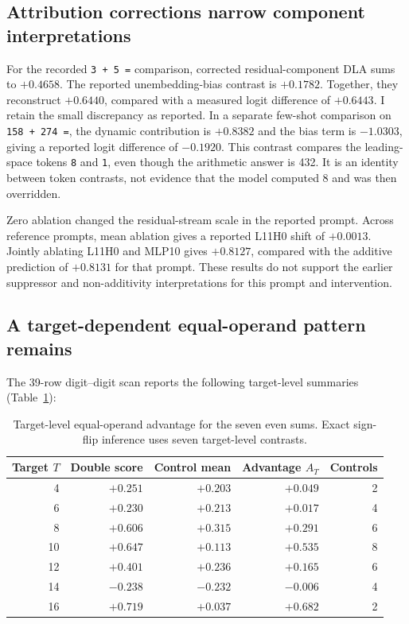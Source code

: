 \documentclass[11pt]{article}
\begin{document}
\subsection{Attribution corrections narrow component interpretations}

For the recorded \texttt{3 + 5 =} comparison, corrected residual-component DLA sums to $+0.4658$. The reported unembedding-bias contrast is $+0.1782$. Together, they reconstruct $+0.6440$, compared with a measured logit difference of $+0.6443$. I retain the small discrepancy as reported. In a separate few-shot comparison on \texttt{158 + 274 =}, the dynamic contribution is $+0.8382$ and the bias term is $-1.0303$, giving a reported logit difference of $-0.1920$. This contrast compares the leading-space tokens \texttt{8} and \texttt{1}, even though the arithmetic answer is 432. It is an identity between token contrasts, not evidence that the model computed 8 and was then overridden.

Zero ablation changed the residual-stream scale in the reported prompt. Across reference prompts, mean ablation gives a reported L11H0 shift of $+0.0013$. Jointly ablating L11H0 and MLP10 gives $+0.8127$, compared with the additive prediction of $+0.8131$ for that prompt. These results do not support the earlier suppressor and non-additivity interpretations for this prompt and intervention.

\subsection{A target-dependent equal-operand pattern remains}

The 39-row digit--digit scan reports the following target-level summaries (Table~\ref{tab:doubles-targets}):

\begin{table}[t]
\centering
\caption{Target-level equal-operand advantage for the seven even sums. Exact sign-flip inference uses seven target-level contrasts.}
\label{tab:doubles-targets}
\small
\begin{tabular}{rrrrr}
\toprule
Target $T$ & Double score & Control mean & Advantage $A_T$ & Controls \\
\midrule
4  & $+0.251$ & $+0.203$ & $+0.049$ & 2 \\
6  & $+0.230$ & $+0.213$ & $+0.017$ & 4 \\
8  & $+0.606$ & $+0.315$ & $+0.291$ & 6 \\
10 & $+0.647$ & $+0.113$ & $+0.535$ & 8 \\
12 & $+0.401$ & $+0.236$ & $+0.165$ & 6 \\
14 & $-0.238$ & $-0.232$ & $-0.006$ & 4 \\
16 & $+0.719$ & $+0.037$ & $+0.682$ & 2 \\
\bottomrule
\end{tabular}
\end{table}
\end{document}
